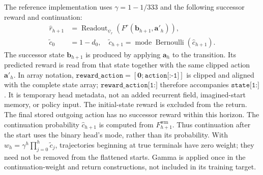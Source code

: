\documentclass{article}
\begin{document}
The reference implementation uses $\gamma=1-1/333$ and the following successor reward and continuation:
\begin{align}
\hat r_{h+1}&=\operatorname{Readout}_{\psi_r}(F^r(\mathbf b_{h+1},\mathbf a'_h)),
\label{eq:imagined_reward}\\
\tilde c_0&=1-d_0,\quad
\tilde c_{h+1}=\operatorname{mode}\operatorname{Bernoulli}(\hat c_{h+1}).
\label{eq:imagined_continuation}
\end{align}
The successor state $\mathbf b_{h+1}$ is produced by applying $\mathbf a_h$ to the transition. Its predicted reward is read from that state together with the same clipped action $\mathbf a'_h$. In array notation, $\texttt{reward\_action}=[\mathbf0;\texttt{action[:-1]}]$ is clipped and aligned with the complete state array; $\texttt{reward\_action[1:]}$ therefore accompanies $\texttt{state[1:]}$. It is temporary head metadata, not an added recurrent field, imagined-start memory, or policy input. The initial-state reward is excluded from the return. The final stored outgoing action has no successor reward within this horizon. The continuation probability $\hat c_{h+1}$ is computed from $F_{h+1}^{\mathrm{wm}}$. Thus continuation after the start uses the binary head's mode, rather than its probability. With $w_h=\gamma^h\prod_{j=0}^{h}\tilde c_j$, trajectories beginning at true terminals have zero weight; they need not be removed from the flattened starts. Gamma is applied once in the continuation-weight and return constructions, not included in its training target.
\end{document}
